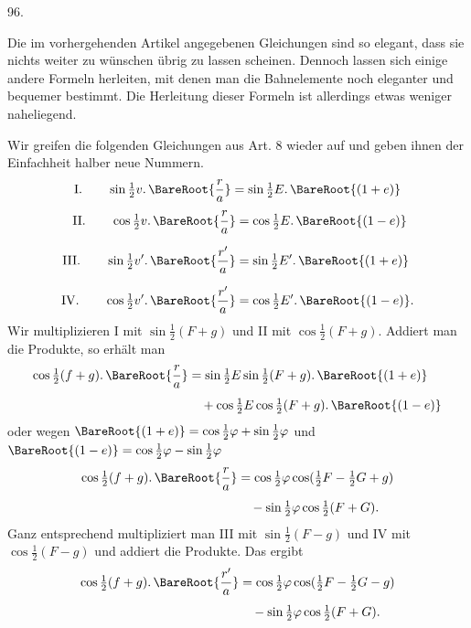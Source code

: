 \par{}\medskip
\hypertarget{native-130-article096}{}
\begin{center}96.\end{center}
Die im vorhergehenden Artikel angegebenen Gleichungen sind so elegant, dass sie nichts weiter zu wünschen übrig zu lassen scheinen. Dennoch lassen sich einige andere Formeln herleiten, mit denen man die Bahnelemente noch eleganter und bequemer bestimmt. Die Herleitung dieser Formeln ist allerdings etwas weniger naheliegend.

Wir greifen die folgenden Gleichungen aus Art. 8 wieder auf und geben ihnen der Einfachheit halber neue Nummern.
\[
\mathrm{I.}\qquad \sin\tfrac12 v\mathpunct{.}\BareRoot{\dfrac{r}{a}}=\sin\tfrac12 E\mathpunct{.}\BareRoot{(1+e)}
\]
\[
\begin{aligned}
\mathrm{II.}\qquad \cos\tfrac12 v\mathpunct{.}\BareRoot{\dfrac{r}{a}}&=\cos\tfrac12 E\mathpunct{.}\BareRoot{(1-e)}\\[6pt]
\mathrm{III.}\qquad \sin\tfrac12 v'\mathpunct{.}\BareRoot{\dfrac{r'}{a}}&=\sin\tfrac12 E'\mathpunct{.}\BareRoot{(1+e)}\\[6pt]
\mathrm{IV.}\qquad \cos\tfrac12 v'\mathpunct{.}\BareRoot{\dfrac{r'}{a}}&=\cos\tfrac12 E'\mathpunct{.}\BareRoot{(1-e)}.
\end{aligned}
\]
Wir multiplizieren I mit $\sin\frac12(F+g)$ und II mit $\cos\frac12(F+g)$. Addiert man die Produkte, so erhält man
\[
\begin{aligned}
\cos\tfrac12(f+g)\mathpunct{.}\BareRoot{\dfrac{r}{a}}&=\sin\tfrac12 E\sin\tfrac12(F+g)\mathpunct{.}\BareRoot{(1+e)}\\[4pt]
&\quad+\cos\tfrac12 E\cos\tfrac12(F+g)\mathpunct{.}\BareRoot{(1-e)}
\end{aligned}
\]
oder wegen $\BareRoot{(1+e)}=\cos\frac12\varphi+\sin\frac12\varphi$ und $\BareRoot{(1-e)}=\cos\frac12\varphi-\sin\frac12\varphi$
\[
\begin{aligned}
\cos\tfrac12(f+g)\mathpunct{.}\BareRoot{\dfrac{r}{a}}&=\cos\tfrac12\varphi\cos(\tfrac12 F-\tfrac12 G+g)\\[4pt]
&\quad-\sin\tfrac12\varphi\cos\tfrac12(F+G).
\end{aligned}
\]
Ganz entsprechend multipliziert man III mit $\sin\frac12(F-g)$ und IV mit $\cos\frac12(F-g)$ und addiert die Produkte. Das ergibt
\[
\begin{aligned}
\cos\tfrac12(f+g)\mathpunct{.}\BareRoot{\dfrac{r'}{a}}&=\cos\tfrac12\varphi\cos(\tfrac12 F-\tfrac12 G-g)\\[4pt]
&\quad-\sin\tfrac12\varphi\cos\tfrac12(F+G).
\end{aligned}
\]
